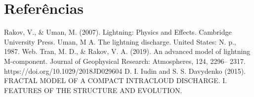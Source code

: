 \documentclass[a4paper, 12pt, onecolumn,singlespacing]{article}
\begin{document}
	
	\pagebreak
	\section{Referências}
	\begin{thebibliography}{99}
		 Rakov, V., \& Uman, M. (2007). Lightning: Physics and Effects. Cambridge University Press.		
		  Uman, M A. The lightning discharge. United States: N. p., 1987. Web. 
		  Tran, M. D., \& Rakov, V. A. (2019). An advanced model of lightning M-component. Journal of Geophysical Research: Atmospheres, 124, 2296– 2317. https://doi.org/10.1029/2018JD029604 
		 D. I. Iudin and S. S. Davydenko (2015). FRACTAL MODEL OF A COMPACT INTRACLOUD DISCHARGE. I. FEATURES OF THE STRUCTURE AND EVOLUTION.
	\end{thebibliography}
\end{document}
